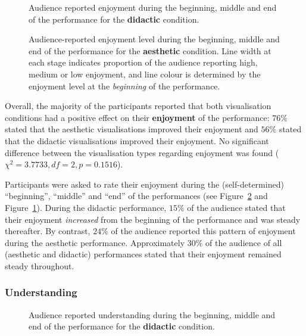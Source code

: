 \documentclass{sig-alternate}
\begin{document}
\begin{figure}
\centering
{}
\caption{Audience reported enjoyment during the beginning, middle and
  end of the performance for the \textbf{didactic} condition.}
\label{fig:didactic-enjoyment}
\end{figure}

\begin{figure}
  \centering {}
  \caption{Audience-reported enjoyment level during the beginning,
    middle and end of the performance for the \textbf{aesthetic} condition.
    Line width at each stage indicates proportion of the audience
    reporting high, medium or low enjoyment, and line colour is
    determined by the enjoyment level at the \emph{beginning} of the
    performance.}
\label{fig:aesthetic-enjoyment}
\end{figure}

Overall, the majority of the participants reported that both
visualisation conditions had a positive effect on their
\textbf{enjoyment} of the performance: $76\%$ stated that the
aesthetic visualisations improved their enjoyment and $56\%$ stated
that the didactic visualisations improved their enjoyment. No
significant difference between the visualisation types regarding 
enjoyment was found ($\chi^2=3.7733,df=2,p=0.1516$).

Participants were asked to rate their enjoyment during the
(self-determined) ``beginning'', ``middle'' and ``end'' of the
performances (see Figure~\ref{fig:aesthetic-enjoyment} and
Figure~\ref{fig:didactic-enjoyment}). During the didactic
performance, $15\%$ of the audience stated that their enjoyment
\emph{increased} from the beginning of the performance and was
steady thereafter. By contrast, $24\%$ of the audience
reported this pattern of enjoyment during the aesthetic
performance. Approximately $30\%$ of the audience of all
(aesthetic and didactic) performances stated that their
enjoyment remained steady throughout.

\subsubsection{Understanding}

\begin{figure}
\centering
{}
\caption{Audience reported understanding during the beginning, middle
  and end of the performance for the \textbf{didactic} condition.}
\label{fig:didactic-understanding}
\end{figure}
\end{document}
